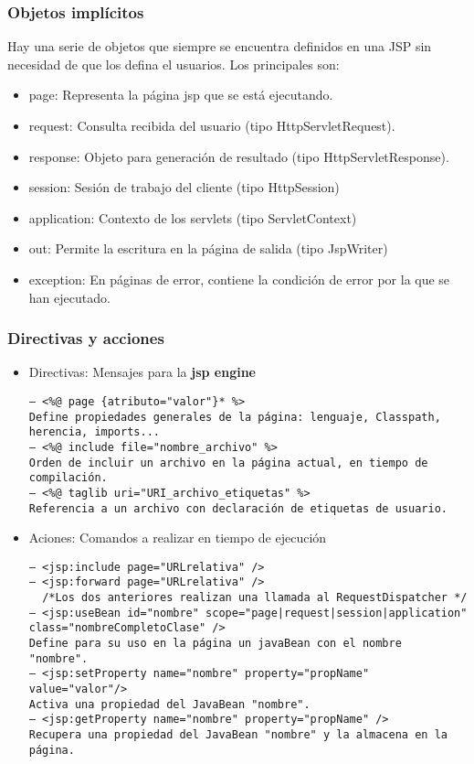 \documentclass{apuntes}
\begin{document}
\subsubsection{Objetos implícitos}
Hay una serie de objetos que siempre se encuentra definidos en una JSP sin necesidad de que los defina el usuarios. Los principales son:
\begin{itemize}
\item page: Representa la página jsp que se está ejecutando.
\item request: Consulta recibida del usuario (tipo HttpServletRequest).
\item response: Objeto para generación de resultado (tipo HttpServletResponse).
\item session: Sesión de trabajo del cliente (tipo HttpSession)
\item application: Contexto de los servlets (tipo ServletContext)
\item out: Permite la escritura en la página de salida (tipo JspWriter)
\item exception: En páginas de error, contiene la condición de error por la que se han ejecutado.
\end{itemize}

\subsubsection{Directivas y acciones}
\begin{itemize}
\item Directivas: Mensajes para la \textbf{jsp engine}
\begin{verbatim}
– <%@ page {atributo="valor"}* %>
Define propiedades generales de la página: lenguaje, Classpath,
herencia, imports...
– <%@ include file="nombre_archivo" %>
Orden de incluir un archivo en la página actual, en tiempo de
compilación.
– <%@ taglib uri="URI_archivo_etiquetas" %>
Referencia a un archivo con declaración de etiquetas de usuario.
\end{verbatim}
\item Aciones: Comandos a realizar en tiempo de ejecución
\begin{verbatim}
– <jsp:include page="URLrelativa" />
– <jsp:forward page="URLrelativa" />
  /*Los dos anteriores realizan una llamada al RequestDispatcher */
– <jsp:useBean id="nombre" scope="page|request|session|application"
class="nombreCompletoClase" />
Define para su uso en la página un javaBean con el nombre
"nombre".
– <jsp:setProperty name="nombre" property="propName"
value="valor"/>
Activa una propiedad del JavaBean "nombre".
– <jsp:getProperty name="nombre" property="propName" />
Recupera una propiedad del JavaBean "nombre" y la almacena en la
página.
\end{verbatim}
\end{itemize}
\end{document}
